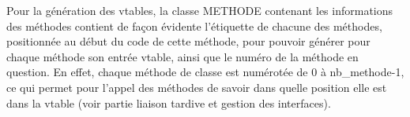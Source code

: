 Pour la génération des vtables, la classe METHODE contenant les informations des méthodes contient de façon évidente l'étiquette de chacune des méthodes, positionnée au début du code de cette méthode, 
pour pouvoir générer pour chaque méthode son entrée vtable, ainsi que le numéro de la méthode en question. En effet, chaque méthode de classe est numérotée de 0 à nb\_methode-1, ce qui permet 
pour l'appel des méthodes de savoir dans quelle position elle est dans la vtable (voir partie liaison tardive et gestion des interfaces).


